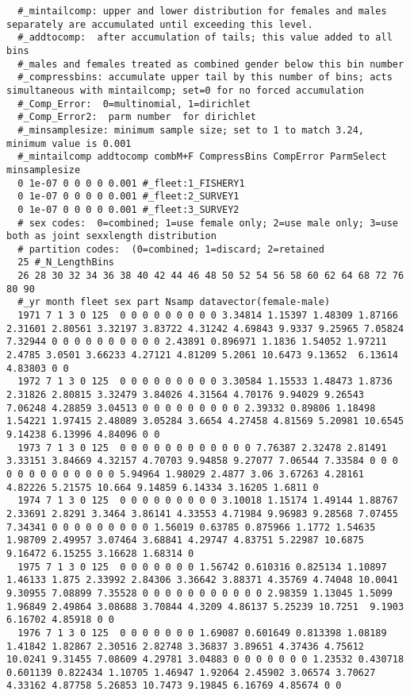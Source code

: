 \begin{landscape}
{\begin{verbatim}
  #_mintailcomp: upper and lower distribution for females and males separately are accumulated until exceeding this level.
  #_addtocomp:  after accumulation of tails; this value added to all bins
  #_males and females treated as combined gender below this bin number 
  #_compressbins: accumulate upper tail by this number of bins; acts simultaneous with mintailcomp; set=0 for no forced accumulation
  #_Comp_Error:  0=multinomial, 1=dirichlet
  #_Comp_Error2:  parm number  for dirichlet
  #_minsamplesize: minimum sample size; set to 1 to match 3.24, minimum value is 0.001
  #_mintailcomp addtocomp combM+F CompressBins CompError ParmSelect minsamplesize
  0 1e-07 0 0 0 0 0.001 #_fleet:1_FISHERY1
  0 1e-07 0 0 0 0 0.001 #_fleet:2_SURVEY1
  0 1e-07 0 0 0 0 0.001 #_fleet:3_SURVEY2
  # sex codes:  0=combined; 1=use female only; 2=use male only; 3=use both as joint sexxlength distribution
  # partition codes:  (0=combined; 1=discard; 2=retained
  25 #_N_LengthBins
  26 28 30 32 34 36 38 40 42 44 46 48 50 52 54 56 58 60 62 64 68 72 76 80 90
  #_yr month fleet sex part Nsamp datavector(female-male)
  1971 7 1 3 0 125  0 0 0 0 0 0 0 0 0 3.34814 1.15397 1.48309 1.87166 2.31601 2.80561 3.32197 3.83722 4.31242 4.69843 9.9337 9.25965 7.05824 7.32944 0 0 0 0 0 0 0 0 0 0 2.43891 0.896971 1.1836 1.54052 1.97211 2.4785 3.0501 3.66233 4.27121 4.81209 5.2061 10.6473 9.13652  6.13614 4.83803 0 0
  1972 7 1 3 0 125  0 0 0 0 0 0 0 0 0 3.30584 1.15533 1.48473 1.8736 2.31826 2.80815 3.32479 3.84026 4.31564 4.70176 9.94029 9.26543 7.06248 4.28859 3.04513 0 0 0 0 0 0 0 0 0 2.39332 0.89806 1.18498 1.54221 1.97415 2.48089 3.05284 3.6654 4.27458 4.81569 5.20981 10.6545  9.14238 6.13996 4.84096 0 0
  1973 7 1 3 0 125  0 0 0 0 0 0 0 0 0 0 0 0 7.76387 2.32478 2.81491 3.33151 3.84669 4.32157 4.70703 9.94858 9.27077 7.06544 7.33584 0 0 0 0 0 0 0 0 0 0 0 0 0 5.94964 1.98029 2.4877 3.06 3.67263 4.28161 4.82226 5.21575 10.664 9.14859 6.14334 3.16205 1.6811 0
  1974 7 1 3 0 125  0 0 0 0 0 0 0 0 0 3.10018 1.15174 1.49144 1.88767 2.33691 2.8291 3.3464 3.86141 4.33553 4.71984 9.96983 9.28568 7.07455 7.34341 0 0 0 0 0 0 0 0 0 1.56019 0.63785 0.875966 1.1772 1.54635 1.98709 2.49957 3.07464 3.68841 4.29747 4.83751 5.22987 10.6875  9.16472 6.15255 3.16628 1.68314 0
  1975 7 1 3 0 125  0 0 0 0 0 0 0 1.56742 0.610316 0.825134 1.10897 1.46133 1.875 2.33992 2.84306 3.36642 3.88371 4.35769 4.74048 10.0041 9.30955 7.08899 7.35528 0 0 0 0 0 0 0 0 0 0 0 2.98359 1.13045 1.5099 1.96849 2.49864 3.08688 3.70844 4.3209 4.86137 5.25239 10.7251  9.1903 6.16702 4.85918 0 0
  1976 7 1 3 0 125  0 0 0 0 0 0 0 1.69087 0.601649 0.813398 1.08189 1.41842 1.82867 2.30516 2.82748 3.36837 3.89651 4.37436 4.75612 10.0241 9.31455 7.08609 4.29781 3.04883 0 0 0 0 0 0 0 1.23532 0.430718 0.601139 0.822434 1.10705 1.46947 1.92064 2.45902 3.06574 3.70627   4.33162 4.87758 5.26853 10.7473 9.19845 6.16769 4.85674 0 0

\end{verbatim}}
\end{landscape}
